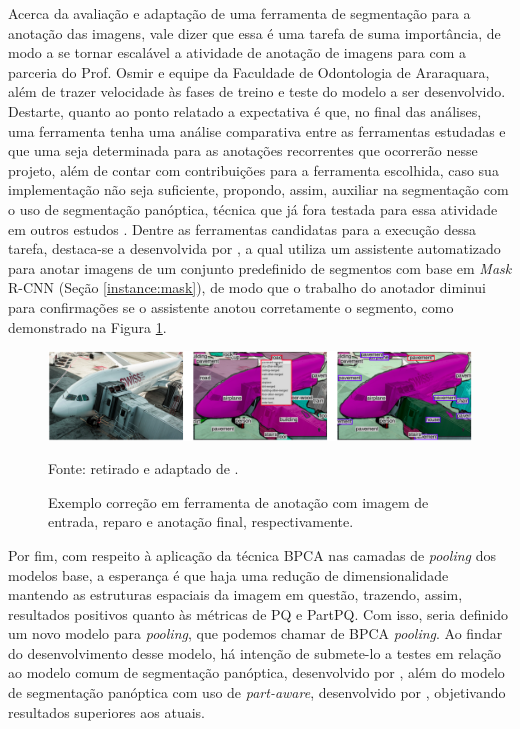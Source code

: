 Acerca da avaliação e adaptação de uma ferramenta de segmentação para a anotação das imagens, vale dizer que essa é uma tarefa de suma importância, de modo a se tornar escalável a atividade de anotação de imagens para com a parceria do Prof. Osmir e equipe da Faculdade de Odontologia de Araraquara, além de trazer velocidade às fases de treino e teste do modelo a ser desenvolvido. Destarte, quanto ao ponto relatado a expectativa é que, no final das análises, uma ferramenta tenha uma análise comparativa entre as ferramentas estudadas e que uma seja determinada para as anotações recorrentes que ocorrerão nesse projeto, além de contar com contribuições para a ferramenta escolhida, caso sua implementação não seja suficiente, propondo, assim, auxiliar na segmentação com o uso de segmentação panóptica, técnica que já fora testada para essa atividade em outros estudos \cite{Elharrouss2021, Jasper2020}. Dentre as ferramentas candidatas para a execução dessa tarefa, destaca-se a desenvolvida por \cite{Jasper2020}, a qual utiliza um assistente automatizado para anotar imagens de um conjunto predefinido de segmentos com base em \textit{Mask} R-CNN (Seção \ref{instance:mask}), de modo que o trabalho do anotador diminui para confirmações se o assistente anotou corretamente o segmento, como demonstrado na Figura \ref{proposal:expres:fig:7}.

\begin{figure}[H]
    \centering
    \caption{Exemplo correção em ferramenta de anotação com imagem de entrada, reparo e anotação final, respectivamente.}
    \includegraphics[width=1\textwidth]{recursos/imagens/proposal/annotation_tool.png}
    \label{proposal:expres:fig:7}

    Fonte: retirado e adaptado de \cite{Jasper2020}.
\end{figure}

Por fim, com respeito à aplicação da técnica BPCA nas camadas de \textit{pooling} dos modelos base, a esperança é que haja uma redução de dimensionalidade mantendo as estruturas espaciais da imagem em questão, trazendo, assim, resultados positivos quanto às métricas de PQ e PartPQ. Com isso, seria definido um novo modelo para \textit{pooling}, que podemos chamar de BPCA \textit{pooling}. Ao findar do desenvolvimento desse modelo, há intenção de submete-lo a testes em relação ao modelo comum de segmentação panóptica, desenvolvido por \cite{Kirillov2019a}, além do modelo de segmentação panóptica com uso de \textit{part-aware}, desenvolvido por \cite{DeGeus2021}, objetivando resultados superiores aos atuais.